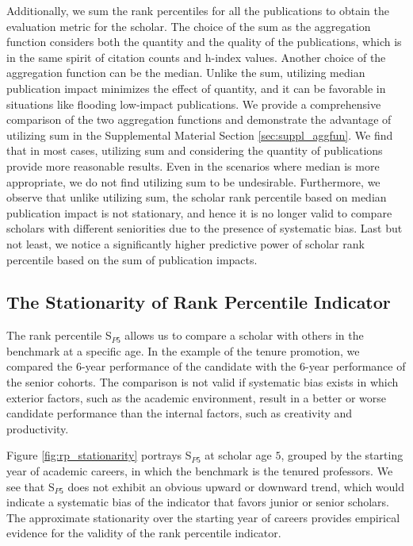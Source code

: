 Additionally, we sum the rank percentiles for all the publications to obtain the evaluation metric for the scholar. The choice of the sum as the aggregation function considers both the quantity and the quality of the publications, which is in the same spirit of citation counts and h-index values. Another choice of the aggregation function can be the median. Unlike the sum, utilizing median publication impact minimizes the effect of quantity, and it can be favorable in situations like flooding low-impact publications. We provide a comprehensive comparison of the two aggregation functions and demonstrate the advantage of utilizing sum in the Supplemental Material Section \ref{sec:suppl_aggfun}. We find that in most cases, utilizing sum and considering the quantity of publications provide more reasonable results. Even in the scenarios where median is more appropriate, we do not find utilizing sum to be undesirable. Furthermore, we observe that unlike utilizing sum, the scholar rank percentile based on median publication impact is not stationary, and hence it is no longer valid to compare scholars with different seniorities due to the presence of systematic bias. Last but not least, we notice a significantly higher predictive power of scholar rank percentile based on the sum of publication impacts.

\subsection*{The Stationarity of Rank Percentile Indicator}

The rank percentile S$_{P5}$ allows us to compare a scholar with others in the benchmark at a specific age. In the example of the tenure promotion, we compared the 6-year performance of the candidate with the 6-year performance of the senior cohorts. The comparison is not valid if systematic bias exists in which exterior factors, such as the academic environment, result in a better or worse candidate performance than the internal factors, such as creativity and productivity.

Figure \ref{fig:rp_stationarity} portrays S$_{P5}$ at scholar age $5$, grouped by the starting year of academic careers, in which the benchmark is the tenured professors. We see that S$_{P5}$ does not exhibit an obvious upward or downward trend, which would indicate a systematic bias of the indicator that favors junior or senior scholars. The approximate stationarity over the starting year of careers provides empirical evidence for the validity of the rank percentile indicator. 

